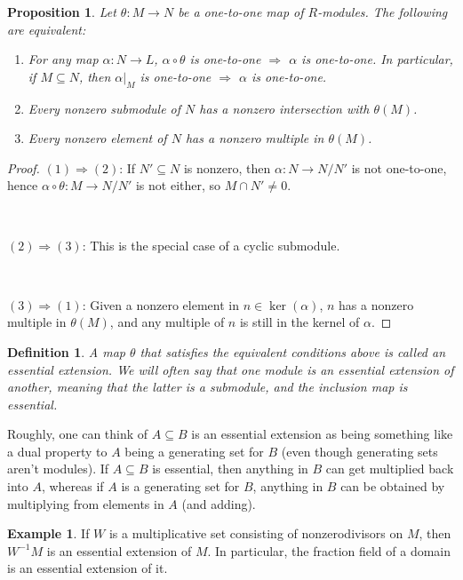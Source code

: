 \documentclass[11pt]{book}
\newtheorem{proposition}[theorem]{Proposition}
\newtheorem{definition}[theorem]{Definition}
\numberwithin{equation}{section}
\numberwithin{theorem}{chapter}
\theoremstyle{definition}
\newtheorem{example}[theorem]{Example}
\newtheorem*{basic properties}{Basic Properties}
\newtheorem*{Important Remark}{Important Remark}
\theoremstyle{remark}
\renewcommand{\ker}{\operatorname{ker}}
\begin{document}
\begin{proposition}
	Let $\theta:M\to N$ be a one-to-one map of $R$-modules. The following are equivalent:
	\begin{enumerate}
		\item For any map $\alpha:N\to L$, $\alpha\circ \theta$ is one-to-one $\Rightarrow$ $\alpha$ is one-to-one. In particular, if $M\subseteq N$, then $\alpha|_M$ is one-to-one $\Rightarrow$ $\alpha$ is one-to-one.
		\item Every nonzero submodule of $N$ has a nonzero intersection with $\theta(M)$.
		\item Every nonzero element of $N$ has a nonzero multiple in $\theta(M)$.
	\end{enumerate}
\end{proposition}
\begin{proof}
	$(1)\Rightarrow (2)$: If $N'\subseteq N$ is nonzero, then $\alpha:N \to N/N'$ is not one-to-one, hence $\alpha\circ \theta:M \to N/N'$ is not either, so $M\cap N' \neq 0$.
	
	\
	
		$(2)\Rightarrow (3)$: This is the special case of a cyclic submodule.
		
		\
		
		$(3)\Rightarrow (1)$: Given a nonzero element in $n\in\ker(\alpha)$, $n$ has a nonzero multiple in $\theta(M)$, and any multiple of $n$ is still in the kernel of $\alpha$. 
\end{proof}


\begin{definition}
	A map $\theta$ that satisfies the equivalent conditions above is called an \emph{essential extension}. We will often say that one module is an essential extension of another, meaning that the latter is a submodule, and the inclusion map is essential.
\end{definition}

Roughly, one can think of $A\subseteq B$ is an essential extension as being something like a dual property to $A$ being a generating set for $B$ (even though generating sets aren't modules). If $A \subseteq B$ is essential, then anything in $B$ can get multiplied back into $A$, whereas if $A$ is a generating set for $B$, anything in $B$ can be obtained by multiplying from elements in $A$ (and adding).

\begin{example}\label{ex:localization essential}
	If $W$ is a multiplicative set consisting of nonzerodivisors on $M$, then $W^{-1}M$ is an essential extension of $M$. In particular, the fraction field of a domain is an essential extension of it.
\end{example}
\end{document}
